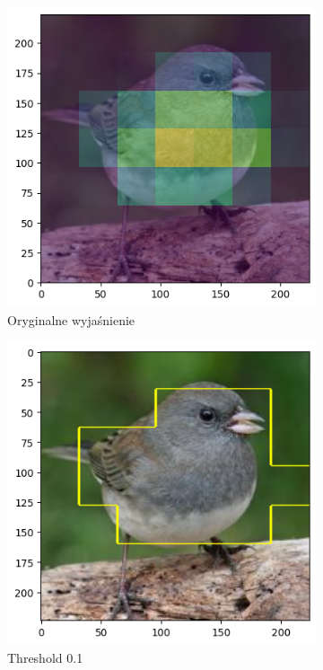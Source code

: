\begin{figure}[!h]
	\centering
	\begin{subfigure}[b]{0.9\textwidth}
		\centering
		\includegraphics[width=.45\textwidth]{img/parameters/gradcam/threshold_base}
		\caption{Oryginalne wyjaśnienie}  \label{rys:parameters_lime_numsamples_5}
	\end{subfigure}
	\begin{subfigure}[b]{0.45\textwidth}
		\centering\includegraphics[width=.9\textwidth]{img/parameters/gradcam/threshold_01}
		\caption{Threshold 0.1}  \label{rys:parameters_lime_numsamples_1000}
	\end{subfigure}
	\begin{subfigure}[b]{0.45\textwidth}

\end{subfigure}
\end{figure}

